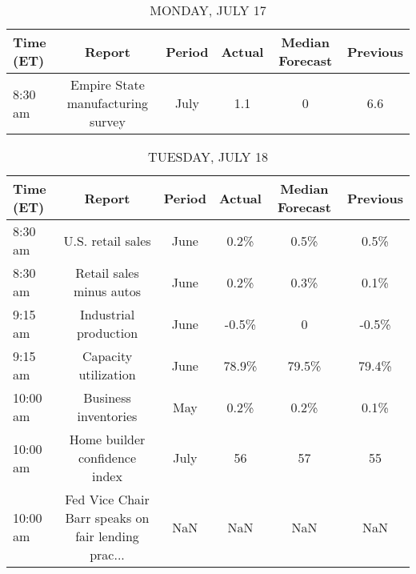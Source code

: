 \documentclass{article}%
\begin{document}
%
\normalsize%


\begin{table}[htbp]%
\caption{MONDAY, JULY 17}%
\centering%
\begin{adjustbox}{width=1\textwidth}%
\begin{tabular}{lccccc}
\toprule
Time (ET) &                            Report & Period & Actual & Median Forecast & Previous \\
\midrule
  8:30 am & Empire State manufacturing survey &   July &    1.1 &               0 &      6.6 \\
\bottomrule
\end{tabular}
%
\end{adjustbox}%
\end{table}

%


\begin{table}[htbp]%
\caption{TUESDAY, JULY 18}%
\centering%
\begin{adjustbox}{width=1\textwidth}%
\begin{tabular}{lccccc}
\toprule
Time (ET) &                                             Report & Period & Actual & Median Forecast & Previous \\
\midrule
  8:30 am &                                  U.S. retail sales &   June &   0.2\% &            0.5\% &     0.5\% \\
  8:30 am &                           Retail sales minus autos &   June &   0.2\% &            0.3\% &     0.1\% \\
  9:15 am &                              Industrial production &   June &  -0.5\% &               0 &    -0.5\% \\
  9:15 am &                               Capacity utilization &   June &  78.9\% &           79.5\% &    79.4\% \\
 10:00 am &                               Business inventories &    May &   0.2\% &            0.2\% &     0.1\% \\
 10:00 am &                      Home builder confidence index &   July &     56 &              57 &       55 \\
 10:00 am & Fed Vice Chair Barr speaks on fair lending prac... &    NaN &    NaN &             NaN &      NaN \\
\bottomrule
\end{tabular}
%
\end{adjustbox}%
\end{table}

%
\end{document}
